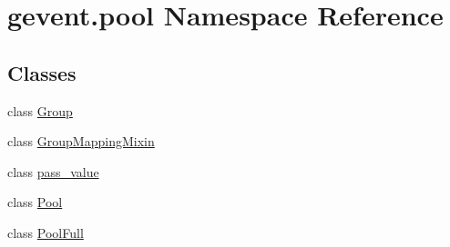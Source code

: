 \hypertarget{namespacegevent_1_1pool}{}\section{gevent.\+pool Namespace Reference}
\label{namespacegevent_1_1pool}
\subsection*{Classes}
\begin{DoxyCompactItemize}
\item 
class \hyperlink{classgevent_1_1pool_1_1_group}{Group}
\item 
class \hyperlink{classgevent_1_1pool_1_1_group_mapping_mixin}{Group\+Mapping\+Mixin}
\item 
class \hyperlink{classgevent_1_1pool_1_1pass__value}{pass\+\_\+value}
\item 
class \hyperlink{classgevent_1_1pool_1_1_pool}{Pool}
\item 
class \hyperlink{classgevent_1_1pool_1_1_pool_full}{Pool\+Full}
\end{DoxyCompactItemize}
